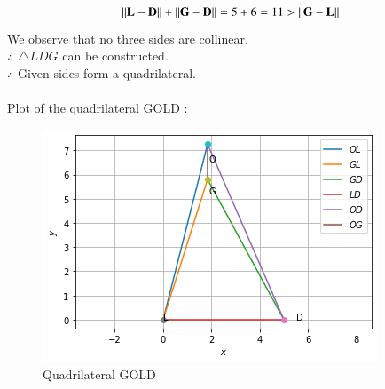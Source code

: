 \documentclass[journal,12pt,twocolumn]{IEEEtran}
\begin{document}
\begin{enumerate}
\begin{align}
\left\lVert\mathbf{L}-\mathbf{D}\right\rVert + \left\lVert\mathbf{G}-\mathbf{D}\right\rVert = 5 + 6 =11 > \left\lVert\mathbf{G}-\mathbf{L}\right\rVert
\end{align}
We observe that no three sides are collinear.
\\
$\therefore$ $\triangle LDG$ can be constructed.
\\
$\therefore$ Given sides form a quadrilateral.
\\
\\
Plot of the quadrilateral GOLD :
\begin{figure}[ht]
    \centering
    \includegraphics[width=\columnwidth]{QUADRILATERAL.png}
    \caption{Quadrilateral GOLD}
    \label{fig:Quadrilateral GOLD}
\end{figure}
\end{enumerate}
\end{document}
